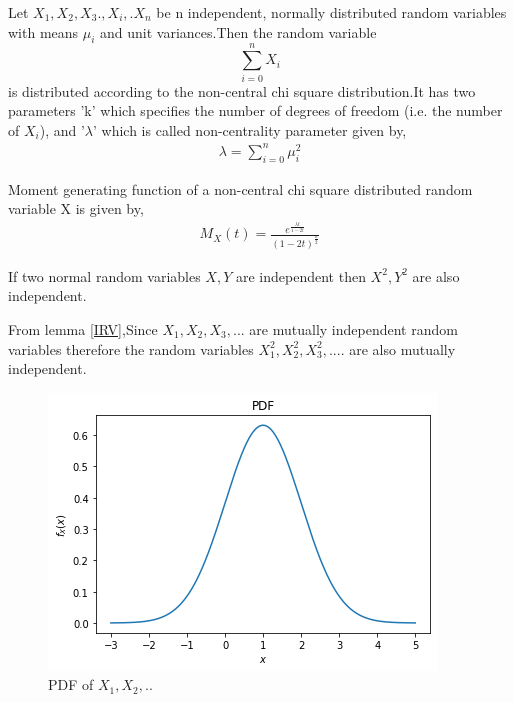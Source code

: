 \documentclass[journal,12pt,twocolumn]{IEEEtran}
\begin{document}
\begin{definition}
Let $X_{1},X_{2},X_{3}.,X_{i},.X_{n}$ be n independent, normally distributed random variables with means $\mu_{i}$ and unit variances.Then the random variable
$$\sum_{i=0}^{n}X_{i}$$ is distributed according to the non-central chi square distribution.It has two parameters 'k' which specifies the number of degrees of freedom (i.e. the number of $X_{i}$), and '$\lambda$' which is called non-centrality parameter given by,
\begin{align}
    \lambda=\sum_{i=0}^{n}\mu_{i}^2
\end{align}
\label{def-NCSD}
\end{definition}
\begin{lemma}
Moment generating function of a non-central chi square distributed random variable X is given by,
\begin{align}
    M_{X}(t)=\frac{e^{\frac{\lambda t}{1-2t}}}{(1-2t)^{\frac{n}{2}}}
\end{align}
\label{MGF}
\end{lemma}
\begin{lemma}
 If two normal random variables $X,Y$ are independent then $X^2,Y^2$ are also independent.
 \label{IRV}
\end{lemma}
 From lemma \ref{IRV},Since $X_{1},X_{2},X_{3},...$ are mutually independent random variables therefore the random variables $X_{1}^{2},X_{2}^{2},X_{3}^{2},....$  are also mutually independent.
\begin{figure}[h]
 \centering
\includegraphics[width=\columnwidth]{PDF.png}
 \caption{PDF of $X_{1},X_{2},..$}
    \label{fig:my_label}
\end{figure}
\end{document}
